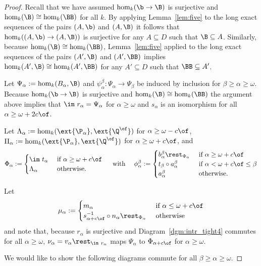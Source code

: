 \begin{proof}
  Recall that we have assumed $\hom_k(\b\to\B)$ is surjective and $\hom_k(\B)\cong \hom_k(\BB)$ for all $k$.
  By applying Lemma~\ref{lem:five} to the long exact sequences of the pairs $(A, \b)$ and $(A, \B)$ it follows that $\hom_k((A, \b)\to (A,\B))$ is surjective for any $A\subseteq D$ such that $\B\subseteq A$.
  Similarly, because $\hom_k(\B)\cong \hom_k(\BB)$, Lemma~\ref{lem:five} applied to the long exact sequences of the pairs $(A', \B)$ and $(A', \BB)$ implies $\hom_k(A', \B)\cong\hom_k(A', \BB)$ for any $A'\subseteq D$ such that $\BB\subseteq A'$.

  Let $\Psi_\alpha := \hom_k(B_\alpha, \B)$ and $\psi_\alpha^\beta : \Psi_\alpha\to \Psi_\beta$ be induced by inclusion for $\beta\geq\alpha\geq\omega$.
  Because $\hom_k(\b\to\B)$ is surjective and $\hom_k(\B)\cong \hom_k(\BB)$ the argument above implies that $\im~r_\alpha = \Psi_\alpha$ for $\alpha\geq\omega$ and $s_\alpha$ is an isomorphism for all $\alpha\geq\omega+2c\of$.

  Let $\Lambda_\alpha :=\hom_k(\ext{\P_\alpha},\ext{\Q^\of})$ for $\alpha\geq\omega-c\of$, $\Pi_\alpha := \hom_k(\ext{\P_\alpha}, \ext{\Q^\of})$ for $\alpha\geq\omega+c\of$, and
  \[ \Phi_\alpha :=\begin{cases} \im~t_\alpha &\text{ if }\alpha\geq\omega+c\of\\ \Lambda_\alpha&\text{ otherwise.}\end{cases}
  \text{\hspace{3ex}with\hspace{3ex}}
  \phi_\alpha^\beta := \begin{cases}
    b_\alpha^\beta\rest_{\Phi_\alpha}&\text{ if } \alpha\geq \omega+c\of\\
    t_\beta\circ a_\alpha^\beta&\text{ if } \alpha < \omega+c\of\leq \beta\\
    a_\alpha^\beta&\text{ otherwise.}
  \end{cases}\]

  Let
  \[ \mu_\alpha :=\begin{cases} m_\alpha&\text{ if } \alpha\leq\omega + c\of\\ s_{\alpha+c\of}^{-1}\circ n_\alpha\rest_{\Phi_\alpha}&\text{ otherwise}\end{cases}\]
  and note that, because $r_\alpha$ is surjective and Diagram~\ref{dgm:intr_tight4} commutes for all $\alpha\geq\omega$, $\nu_\alpha = v_\alpha\rest_{\im~r_{\alpha}}$ maps $\Psi_\alpha$ to $\Phi_{\alpha+c\of}$ for $\alpha\geq\omega$.

  We would like to show the following diagrams commute for all $\beta\geq\alpha\geq\omega$.


\end{proof}
